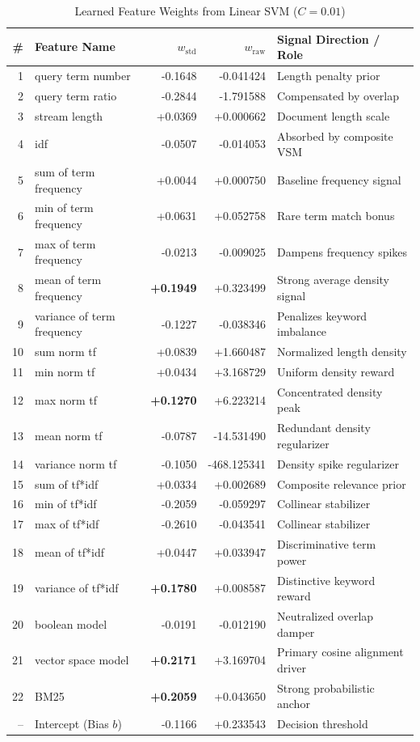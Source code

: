 \documentclass[11pt,a4paper]{article}
\begin{document}
\begin{table}[H]
\centering
\caption{Learned Feature Weights from Linear SVM ($C=0.01$)}
\label{tab:svm_weights}
\small
\renewcommand{\arraystretch}{1.1}
\begin{tabularx}{\textwidth}{rlrrX}
\toprule
\textbf{\#} & \textbf{Feature Name} & \textbf{$w_{\text{std}}$} & \textbf{$w_{\text{raw}}$} & \textbf{Signal Direction / Role} \\
\midrule
1 & query term number & -0.1648 & -0.041424 & Length penalty prior \\
2 & query term ratio & -0.2844 & -1.791588 & Compensated by overlap \\
3 & stream length & +0.0369 & +0.000662 & Document length scale \\
4 & idf & -0.0507 & -0.014053 & Absorbed by composite VSM \\
5 & sum of term frequency & +0.0044 & +0.000750 & Baseline frequency signal \\
6 & min of term frequency & +0.0631 & +0.052758 & Rare term match bonus \\
7 & max of term frequency & -0.0213 & -0.009025 & Dampens frequency spikes \\
8 & mean of term frequency & \textbf{+0.1949} & +0.323499 & Strong average density signal \\
9 & variance of term frequency & -0.1227 & -0.038346 & Penalizes keyword imbalance \\
10 & sum norm tf & +0.0839 & +1.660487 & Normalized length density \\
11 & min norm tf & +0.0434 & +3.168729 & Uniform density reward \\
12 & max norm tf & \textbf{+0.1270} & +6.223214 & Concentrated density peak \\
13 & mean norm tf & -0.0787 & -14.531490 & Redundant density regularizer \\
14 & variance norm tf & -0.1050 & -468.125341 & Density spike regularizer \\
15 & sum of tf*idf & +0.0334 & +0.002689 & Composite relevance prior \\
16 & min of tf*idf & -0.2059 & -0.059297 & Collinear stabilizer \\
17 & max of tf*idf & -0.2610 & -0.043541 & Collinear stabilizer \\
18 & mean of tf*idf & +0.0447 & +0.033947 & Discriminative term power \\
19 & variance of tf*idf & \textbf{+0.1780} & +0.008587 & Distinctive keyword reward \\
20 & boolean model & -0.0191 & -0.012190 & Neutralized overlap damper \\
21 & vector space model & \textbf{+0.2171} & +3.169704 & Primary cosine alignment driver \\
22 & BM25 & \textbf{+0.2059} & +0.043650 & Strong probabilistic anchor \\
-- & Intercept (Bias $b$) & -0.1166 & +0.233543 & Decision threshold \\
\bottomrule
\end{tabularx}
\end{table}
\end{document}
